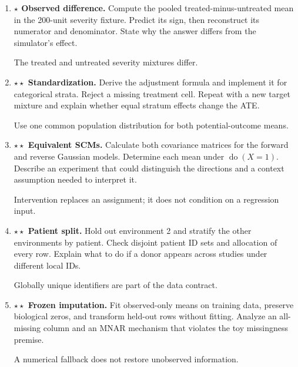 \documentclass[11pt,oneside]{scrbook}
\begin{document}
\begin{enumerate}
\item \textbf{$\star$ Observed difference.} Compute the pooled treated-minus-untreated
mean in the 200-unit severity fixture. Predict its sign, then reconstruct its numerator
and denominator. State why the answer differs from the simulator's effect.
\begin{intuition}The treated and untreated severity mixtures differ.\end{intuition}

\item \textbf{$\star\star$ Standardization.} Derive the adjustment formula and implement
it for categorical strata. Reject a missing treatment cell. Repeat with a new target
mixture and explain whether equal stratum effects change the ATE.
\begin{intuition}Use one common population distribution for both potential-outcome means.\end{intuition}

\item \textbf{$\star\star$ Equivalent SCMs.} Calculate both covariance matrices for
the forward and reverse Gaussian models. Determine each mean under
$\operatorname{do}(X=1)$. Describe an experiment that could distinguish the directions
and a context assumption needed to interpret it.
\begin{intuition}Intervention replaces an assignment; it does not condition on a regression input.\end{intuition}

\item \textbf{$\star\star$ Patient split.} Hold out environment 2 and stratify the other
environments by patient. Check disjoint patient ID sets and allocation of every row.
Explain what to do if a donor appears across studies under different local IDs.
\begin{intuition}Globally unique identifiers are part of the data contract.\end{intuition}

\item \textbf{$\star\star$ Frozen imputation.} Fit observed-only means on training data,
preserve biological zeros, and transform held-out rows without fitting. Analyze an
all-missing column and an MNAR mechanism that violates the toy missingness premise.
\begin{intuition}A numerical fallback does not restore unobserved information.\end{intuition}


\end{enumerate}
\end{document}
